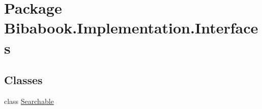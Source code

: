 \hypertarget{namespace_bibabook_1_1_implementation_1_1_interfaces}{}\section{Package Bibabook.\+Implementation.\+Interfaces}
\label{namespace_bibabook_1_1_implementation_1_1_interfaces}
\subsection*{Classes}
\begin{DoxyCompactItemize}
\item 
class \hyperlink{class_bibabook_1_1_implementation_1_1_interfaces_1_1_searchable}{Searchable}
\end{DoxyCompactItemize}
